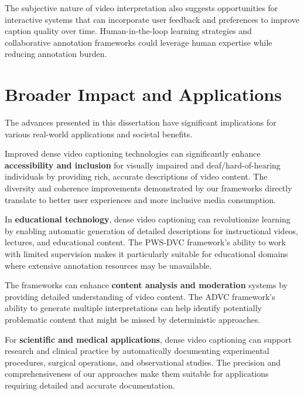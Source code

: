 The subjective nature of video interpretation also suggests opportunities for interactive systems that can incorporate user feedback and preferences to improve caption quality over time. Human-in-the-loop learning strategies and collaborative annotation frameworks could leverage human expertise while reducing annotation burden.

\section{Broader Impact and Applications}
\label{sec:broader_impact}

The advances presented in this dissertation have significant implications for various real-world applications and societal benefits.

Improved dense video captioning technologies can significantly enhance \textbf{accessibility and inclusion} for visually impaired and deaf/hard-of-hearing individuals by providing rich, accurate descriptions of video content. The diversity and coherence improvements demonstrated by our frameworks directly translate to better user experiences and more inclusive media consumption.

In \textbf{educational technology}, dense video captioning can revolutionize learning by enabling automatic generation of detailed descriptions for instructional videos, lectures, and educational content. The PWS-DVC framework's ability to work with limited supervision makes it particularly suitable for educational domains where extensive annotation resources may be unavailable.

The frameworks can enhance \textbf{content analysis and moderation} systems by providing detailed understanding of video content. The ADVC framework's ability to generate multiple interpretations can help identify potentially problematic content that might be missed by deterministic approaches.

For \textbf{scientific and medical applications}, dense video captioning can support research and clinical practice by automatically documenting experimental procedures, surgical operations, and observational studies. The precision and comprehensiveness of our approaches make them suitable for applications requiring detailed and accurate documentation.

